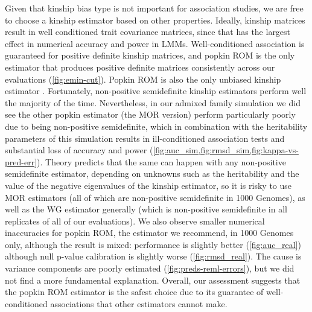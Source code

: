 \documentclass[11pt]{article}
\begin{document}
Given that kinship bias type is not important for association studies, we are free to choose a kinship estimator based on other properties.
Ideally, kinship matrices result in well conditioned trait covariance matrices, since that has the largest effect in numerical accuracy and power in LMMs.
Well-conditioned association is guaranteed for positive definite kinship matrices, and popkin ROM is the only estimator that produces positive definite matrices consistently across our evaluations (\cref{fig:emin-cut}).
Popkin ROM is also the only unbiased kinship estimator \citep{ochoa_estimating_2021}.
Fortunately, non-positive semidefinite kinship estimators perform well the majority of the time.
Nevertheless, in our admixed family simulation we did see the other popkin estimator (the MOR version) perform particularly poorly due to being non-positive semidefinite, which in combination with the heritability parameters of this simulation results in ill-conditioned association tests and substantial loss of accuracy and power (\cref{fig:auc_sim,fig:rmsd_sim,fig:kappa-vs-pred-err}).
Theory predicts that the same can happen with any non-positive semidefinite estimator, depending on unknowns such as the heritability and the value of the negative eigenvalues of the kinship estimator, so it is risky to use MOR estimators (all of which are non-positive semidefinite in 1000 Genomes), as well as the WG estimator generally (which is non-positive semidefinite in all replicates of all of our evaluations).
We also observe smaller numerical inaccuracies for popkin ROM, the estimator we recommend, in 1000 Genomes only, although the result is mixed: performance is slightly better (\cref{fig:auc_real}) although null p-value calibration is slightly worse (\cref{fig:rmsd_real}).
The cause is variance components are poorly estimated (\cref{fig:preds-reml-errors}), but we did not find a more fundamental explanation.
Overall, our assessment suggests that the popkin ROM estimator is the safest choice due to its guarantee of well-conditioned associations that other estimators cannot make.
\end{document}

